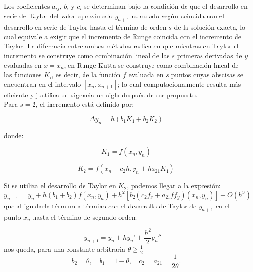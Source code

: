 \documentclass[a4paper,12pt]{article}
\begin{document}
Los coeficientes \(a_{ij}\), \(b_i\) y \(c_i\) se determinan bajo la condición de que el desarrollo en serie de Taylor del valor aproximado \(y_{n+1}\) calculado según coincida con el desarrollo en serie de Taylor hasta el término de orden \(s\) de la solución exacta, lo cual equivale a exigir que el incremento de Runge coincida con el incremento de Taylor. La diferencia entre ambos métodos radica en que mientras en Taylor el incremento se construye como combinación lineal de las \(s\) primeras derivadas de \(y\) evaluadas en \(x = x_n\), en Runge-Kutta se construye como combinación lineal de las funciones \(K_i\), es decir, de la función \(f\) evaluada en \(s\) puntos cuyas abscisas se encuentran en el intervalo \([x_n, x_{n+1}]\); lo cual computacionalmente resulta más eficiente y justifica su vigencia un siglo después de ser propuesto.\\
Para \(s = 2\), el incremento está definido por:

\begin{equation}
\Delta y_n = h (b_1 K_1 + b_2 K_2)
\end{equation}

donde:

\begin{equation}
K_1 = f(x_n, y_n)
\end{equation}

\begin{equation}
K_2 = f(x_n + c_2 h, y_n + h a_{21} K_1)
\end{equation}

Si se utiliza el desarrollo de Taylor en \(K_2\), podemos llegar a la expresión:
\begin{equation}
y_{n+1} = y_{n} + h (b_1 + b_2) f(x_n, y_n) + h^2 \left[b_2 \left(c_2 f_x + a_{21} f f_y\right) (x_n, y_n)\right] + O(h^3)
\end{equation}
que al igualarla término a término con el desarrollo de Taylor de \(y_{n+1}\) en el punto \(x_n\) hasta el término de segundo orden:

\begin{equation}
y_{n+1} = y_n + h y_n' + \frac{h^2}{2} y_n'' \quad
\end{equation}
nos queda, para una constante arbitraria \( \theta \geq \frac{1}{2}\)
\begin{equation}
b_2 = \theta, \quad b_1 = 1 - \theta, \quad c_2 = a_{21} = \frac{1}{2\theta}.
\end{equation}
\end{document}

